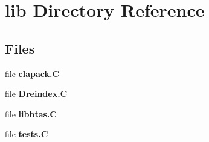 \section{lib Directory Reference}
\label{dir_97aefd0d527b934f1d99a682da8fe6a9}
\subsection*{Files}
\begin{DoxyCompactItemize}
\item 
file {\bf clapack.\-C}
\item 
file {\bf Dreindex.\-C}
\item 
file {\bf libbtas.\-C}
\item 
file {\bf tests.\-C}
\end{DoxyCompactItemize}
